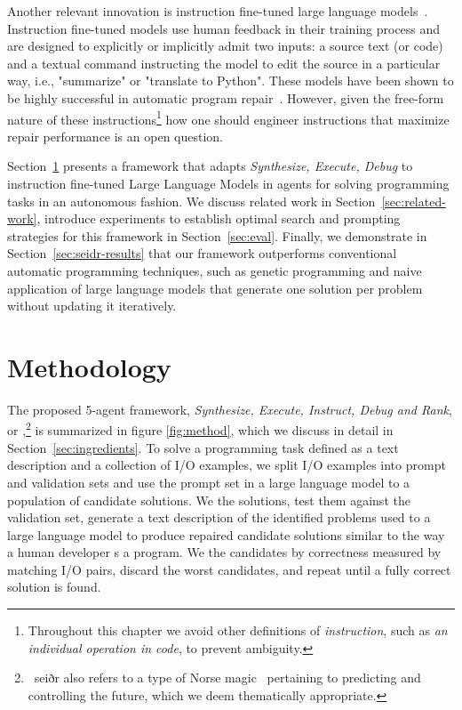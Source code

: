 Another relevant innovation is instruction fine-tuned large language models~\cite{ouyang2022:training}. Instruction fine-tuned models use human feedback in their training process and are designed to explicitly or implicitly admit two inputs: a source text (or code) and a textual command instructing the model to edit the source in a particular way, i.e., "summarize" or "translate to Python".
These models have been shown to be highly successful in automatic program repair~\cite{fanAutomatedRepairPrograms2023}. 
However, given the free-form nature of these instructions\footnote{Throughout this chapter we avoid other definitions of \emph{instruction}, such as \emph{an individual operation in code}, to prevent ambiguity.} how one should engineer instructions that maximize repair performance is an open question. 

Section~\ref{sec:seidr-methodology} presents a framework that adapts \emph{Synthesize, Execute, Debug} to instruction fine-tuned Large Language Models in agents for solving programming tasks in an autonomous fashion. 
We discuss related work in Section~\ref{sec:related-work}, introduce experiments to establish optimal search and prompting strategies for this framework in Section~\ref{sec:eval}. 
Finally, we demonstrate in Section~\ref{sec:seidr-results} that our framework outperforms conventional automatic programming techniques, such as genetic programming and naive application of large language models that generate one solution per problem without updating it iteratively. 

\newpage \section{Methodology}
\label{sec:seidr-methodology}
The proposed 5-agent framework, \emph{Synthesize, Execute, Instruct, Debug and Rank}, or \method{},\footnote{~seiðr also refers to a type of Norse magic~\cite{blain2002:nine} pertaining to predicting and controlling the future, which we deem thematically appropriate.} is summarized in figure \ref{fig:method}, which we discuss in detail in Section~\ref{sec:ingredients}.
To solve a programming task defined as a text description and a collection of I/O examples, we split I/O examples into prompt and validation sets and use the prompt set in a large language model to \synthesize{} a population of candidate solutions.
We \execute{} the solutions, test them against the validation set, generate a text description of the identified problems used to \instruct{} a large language model to produce repaired candidate solutions similar to the way a human developer \debug{}s a program.
We \rank{} the candidates
by correctness measured by matching I/O pairs, discard the worst candidates, and repeat until a fully correct solution is found.

